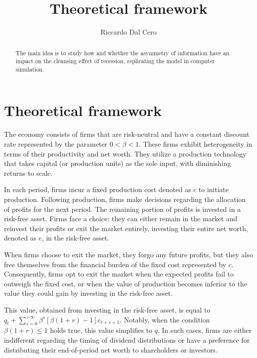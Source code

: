 \documentclass{article}
\title{Theoretical framework}
\author{Riccardo Dal Cero}
\begin{document}
\maketitle

\begin{abstract}
    The main idea is to study how and whether the asymmetry of information have an impact on the cleansing effect of
    recession, replicating the model in computer  simulation.
\end{abstract}

\section[short]{Theoretical framework}
The economy consists of firms that are risk-neutral and have a constant discount rate represented by the parameter $0 <
\beta < 1$. These firms exhibit heterogeneity in terms of their productivity and net worth. They utilize a production
technology that takes capital (or production units) as the sole input, with diminishing returns to scale. 
\par
In each period, firms incur a fixed production cost denoted as $c$ to initiate production. Following production, firms
make decisions regarding the allocation of profits for the next period. The remaining portion of profits is invested in
a risk-free asset. Firms face a choice: they can either remain in the market and reinvest their profits or exit the
market entirely, investing their entire net worth, denoted as $e$, in the risk-free asset. 
\par
When firms choose to exit the market, they forgo any future profits, but they also free themselves from the financial
burden of the fixed cost represented by $c$. Consequently, firms opt to exit the market when the expected profits fail
to outweigh the fixed cost, or when the value of production becomes inferior to the value they could gain by investing
in the risk-free asset.
\par
This value, obtained from investing in the risk-free asset, is equal to $q_t +
\sum_{s=0}^{+\infty}\beta^s[\beta(1+r)-1]e_{t+s+1}$. Notably, when the condition $\beta(1+r) \leq 1$ holds true, this
value simplifies to $q$. In such cases, firms are either indifferent regarding the timing of dividend distributions or
have a preference for distributing their end-of-period net worth to shareholders or investors.
\end{document}

